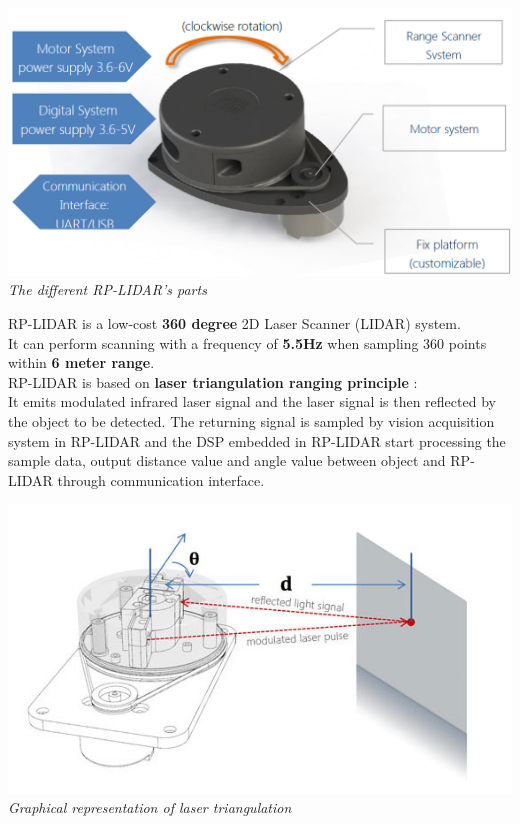 \documentclass[10pt,a4paper]{article}
\begin{document}
\begin{center}
\includegraphics[scale=0.4]{images/lidarParts.png}\\
\textit{The different RP-LIDAR's parts}
\end{center}

RP-LIDAR is a low-cost \textbf{360 degree} 2D Laser Scanner (LIDAR) system.\\
It can perform scanning with a frequency of\textbf{ 5.5Hz} when sampling 360 points within \textbf{6 meter range}. \\

RP-LIDAR is based on \textbf{laser triangulation ranging principle} :\\
It emits modulated infrared laser signal and the laser signal is then reflected by the object to be detected. The returning signal is sampled by vision acquisition system in RP-LIDAR and the DSP embedded in RP-LIDAR start processing the sample data, output distance value and angle value between object and RP-LIDAR through communication interface.\\

\begin{center}
\includegraphics[scale=0.6]{images/robopeak-sensor.jpg}\\
\textit{Graphical representation of laser triangulation}
\end{center}
\end{document}
